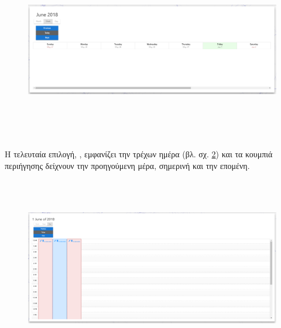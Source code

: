 \begin{figure}[!htb]
\includegraphics[width=\columnwidth, height=8cm]{images/userCalendarWeek.png}
\caption{}
\label{fig:userCalendarWeek}
\end{figure}

\pSpace Η τελευταία επιλογή, , εμφανίζει την τρέχων ημέρα (βλ. σχ. \ref{fig:userCalendarDay}) και τα κουμπιά περιήγησης δείχνουν την προηγούμενη μέρα, σημερινή και την επομένη.

\begin{figure}[!htb]
\includegraphics[width=\columnwidth, height=8cm]{images/userCalendarDay.png}
\caption{}
\label{fig:userCalendarDay}
\end{figure}

\pagebreak

